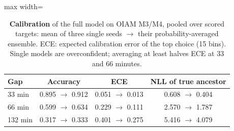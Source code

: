 \begin{table}[t]
\centering\small
\setlength{\tabcolsep}{4pt}
\begin{adjustbox}{max width=\linewidth}
\begin{tabular}{lccc}
\toprule
Gap & Accuracy & ECE & NLL of true ancestor \\
\midrule
33 min & 0.895 $\to$ 0.912 & 0.051 $\to$ 0.013 & 0.608 $\to$ 0.404 \\
66 min & 0.599 $\to$ 0.634 & 0.229 $\to$ 0.111 & 2.570 $\to$ 1.787 \\
132 min & 0.317 $\to$ 0.333 & 0.401 $\to$ 0.275 & 5.416 $\to$ 4.079 \\
\bottomrule
\end{tabular}
\end{adjustbox}
\caption{\textbf{Calibration} of the full model on OIAM M3/M4, pooled over scored targets: mean of three single seeds $\to$ their probability-averaged ensemble. ECE: expected calibration error of the top choice (15 bins). Single models are overconfident; averaging at least halves ECE at 33 and 66 minutes.}
\label{tab:calibration}
\end{table}
